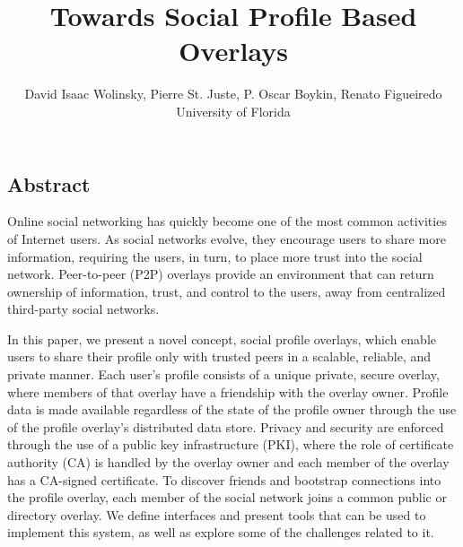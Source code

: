 \documentclass[letterpaper,twocolumn,10pt]{article}
\begin{document}
\title{\Large \bf Towards Social Profile Based Overlays}

\author{
David Isaac Wolinsky,
Pierre St. Juste,
P. Oscar Boykin,
Renato Figueiredo
\\
University of Florida
\\
}




\subsection*{Abstract}
Online social networking has quickly become one of the most common activities of Internet users.
As social networks evolve, they encourage users to share more information,
requiring the users, in turn, to place more trust into the social network.
Peer-to-peer (P2P) overlays provide an environment that can return ownership of
information, trust, and control to the users, away from centralized third-party
social networks.

In this paper, we present a novel concept, social profile overlays,
which enable users to share their profile only with trusted peers in a scalable,
reliable, and private manner.  Each user's profile consists
of a unique private, secure overlay, where members of that overlay have a
friendship with the overlay owner. Profile data is made available regardless of
the state of the profile owner through the use of the profile overlay's
distributed data store.  Privacy and security are enforced through the use of a
public key infrastructure (PKI), where the role of certificate authority (CA) is
handled by the overlay owner and each member of the overlay has a CA-signed
certificate.  To discover friends and bootstrap connections into the profile
overlay, each member of the social network joins a common public or directory
overlay.  We define interfaces and present tools that can be used to implement
this system, as well as explore some of the challenges related to it.
\end{document}

